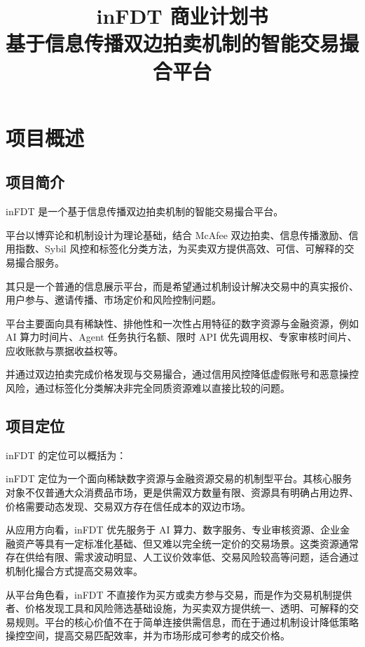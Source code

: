 \documentclass[UTF8,a4paper,12pt]{ctexart}
\title{\textbf{inFDT 商业计划书}\\[0.5em]
\large 基于信息传播双边拍卖机制的智能交易撮合平台}
\author{}
\date{}
\begin{document}
\maketitle

\newpage
\tableofcontents

\section{项目概述}


\subsection{项目简介}


inFDT 是一个基于信息传播双边拍卖机制的智能交易撮合平台。

平台以博弈论和机制设计为理论基础，结合 McAfee 双边拍卖、信息传播激励、信用指数、Sybil 风控和标签化分类方法，为买卖双方提供高效、可信、可解释的交易撮合服务。

其只是一个普通的信息展示平台，而是希望通过机制设计解决交易中的真实报价、用户参与、邀请传播、市场定价和风险控制问题。

平台主要面向具有稀缺性、排他性和一次性占用特征的数字资源与金融资源，例如 AI 算力时间片、Agent 任务执行名额、限时 API 优先调用权、专家审核时间片、应收账款与票据收益权等。

并通过双边拍卖完成价格发现与交易撮合，通过信用风控降低虚假账号和恶意操控风险，通过标签化分类解决非完全同质资源难以直接比较的问题。

\subsection{项目定位}

inFDT 的定位可以概括为：

inFDT 定位为一个面向稀缺数字资源与金融资源交易的机制型平台。其核心服务对象不仅普通大众消费品市场，更是供需双方数量有限、资源具有明确占用边界、价格需要动态发现、交易双方存在信任成本的双边市场。

从应用方向看，inFDT 优先服务于 AI 算力、数字服务、专业审核资源、企业金融资产等具有一定标准化基础、但又难以完全统一定价的交易场景。这类资源通常存在供给有限、需求波动明显、人工议价效率低、交易风险较高等问题，适合通过机制化撮合方式提高交易效率。

从平台角色看，inFDT 不直接作为买方或卖方参与交易，而是作为交易机制提供者、价格发现工具和风险筛选基础设施，为买卖双方提供统一、透明、可解释的交易规则。平台的核心价值不在于简单连接供需信息，而在于通过机制设计降低策略操控空间，提高交易匹配效率，并为市场形成可参考的成交价格。
\end{document}
